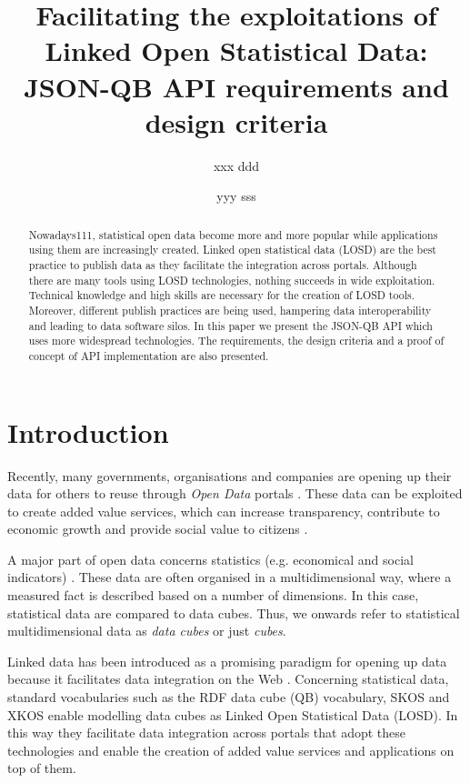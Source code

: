 \documentclass{llncs}
\begin{document}
\title{Facilitating the exploitations of Linked Open Statistical Data: JSON-QB API requirements and design criteria}

\author{xxx ddd \and yyy sss}

\maketitle

\begin{abstract}

Nowadays111, statistical open data become more and more popular while applications using them are increasingly created. Linked open statistical data (LOSD) are the best practice to publish data as they facilitate the integration across portals. Although there are many tools using LOSD technologies, nothing succeeds in wide exploitation. Technical knowledge and high skills are necessary for the creation of LOSD tools. Moreover, different publish practices are being used, hampering data interoperability and leading to data software silos. In this paper we present the JSON-QB API which uses more widespread technologies. The requirements, the design criteria and a proof of concept of API implementation are also presented.  

\end{abstract}

\section{Introduction}\label{sec:intro}

Recently, many governments, organisations and companies are opening up their data for others to reuse through \textit{Open Data} portals  \cite{Kalampokis:2011:IJWET}. These data can be exploited to create added value services, which can increase transparency, contribute to economic growth and provide social value to citizens \cite{Janssen:2012}.

A major part of open data concerns statistics (e.g. economical and social indicators) \cite{Capadisli:2013}. These data are often organised in a multidimensional way, where a measured fact is described based on a number of dimensions. In this case, statistical data are compared to data cubes. Thus, we onwards refer to statistical multidimensional data as \textit{data cubes} or just \textit{cubes}.

Linked data has been introduced as a promising paradigm for opening up data because it facilitates data integration on the Web \cite{Bizer:2009}. Concerning statistical data, standard vocabularies such as the RDF data cube (QB) vocabulary\cite{Cyganiak:2014:W3C}, SKOS\cite{Miles:2009:W3C} and XKOS\cite{XKOS} enable modelling data cubes as Linked Open Statistical Data (LOSD). In this way they facilitate data integration across portals that adopt these technologies and enable the creation of added value services and applications on top of them.
\end{document}
